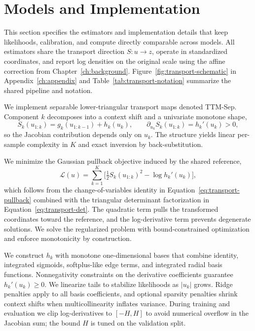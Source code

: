 \documentclass[11pt,a4paper,twoside]{book}\usepackage[]{graphicx}\usepackage[]{xcolor}
\begin{document}
\section{Models and Implementation}\label{sec:models-implementation}

This section specifies the estimators and implementation details that keep likelihoods, calibration, and compute directly comparable across models. All estimators share the transport direction $S:u \rightarrow z$, operate in standardized coordinates, and report log densities on the original scale using the affine correction from Chapter~\ref{ch:background}. Figure~\ref{fig:transport-schematic} in Appendix~\ref{ch:appendix} and Table~\ref{tab:transport-notation} summarize the shared pipeline and notation.

We implement separable lower-triangular transport maps denoted TTM-Sep. Component $k$ decomposes into a context shift and a univariate monotone shape,
\begin{equation}
  S_k(u_{1:k}) = g_k(u_{1:k-1}) + h_k(u_k), \qquad \partial_{u_k} S_k(u_{1:k}) = h_k'(u_k) > 0,
  \label{eq:ttm-separable-def}
\end{equation}
so the Jacobian contribution depends only on $u_k$. The structure yields linear per-sample complexity in $K$ and exact inversion by back-substitution.

We minimize the Gaussian pullback objective induced by the shared reference,
\begin{equation}
  \mathcal{L}(u) = \sum_{k=1}^K \Big[ \tfrac{1}{2} S_k(u_{1:k})^2 - \log h_k'(u_k) \Big],
  \label{eq:ttm-separable-loss}
\end{equation}
which follows from the change-of-variables identity in Equation~\eqref{eq:transport-pullback} combined with the triangular determinant factorization in Equation~\eqref{eq:transport-det}. The quadratic term pulls the transformed coordinates toward the reference, and the log-derivative term prevents degenerate solutions. We solve the regularized problem with bound-constrained optimization and enforce monotonicity by construction.

We construct $h_k$ with monotone one-dimensional bases that combine identity, integrated sigmoids, softplus-like edge terms, and integrated radial basis functions. Nonnegativity constraints on the derivative coefficients guarantee $h_k'(u_k) \ge 0$. We linearize tails to stabilize likelihoods as $|u_k|$ grows. Ridge penalties apply to all basis coefficients, and optional sparsity penalties shrink context shifts when multicollinearity inflates variance. During training and evaluation we clip log-derivatives to $[-H, H]$ to avoid numerical overflow in the Jacobian sum; the bound $H$ is tuned on the validation split.
\end{document}
